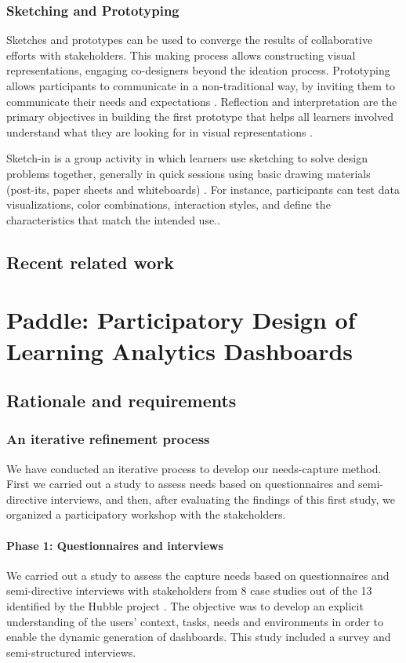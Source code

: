 \documentclass[manuscript,nonacm,12pt]{acmart}
\begin{document}
\subsubsection{Sketching and Prototyping}
Sketches and prototypes can be used to converge the results of collaborative efforts with stakeholders. This making process allows constructing visual representations, engaging co-designers beyond the ideation process. Prototyping allows participants to communicate in a non-traditional way, by inviting them to communicate their needs and expectations \cite{gaver1999design}.
Reflection and interpretation are the primary objectives in building the first prototype that helps all learners involved understand what they are looking for in visual representations \cite{luckin2013handbook}.

Sketch-in is a group activity in which learners use sketching to solve design problems together, generally in quick sessions using basic drawing materials (post-its, paper sheets and whiteboards) \cite{prieto2018co}. For instance, participants can test data visualizations, color combinations, interaction styles, and define the characteristics that match the intended use..



\subsection{Recent related work}


\section{Paddle: Participatory Design of Learning Analytics Dashboards}
\subsection{Rationale and requirements}
\subsubsection{An iterative refinement process}
\label{sec:dimensions}
We have conducted an iterative process to develop our needs-capture method. First we carried out a study to assess needs based on questionnaires and semi-directive interviews, and then, after evaluating  the findings of this first study, we organized a participatory workshop with the stakeholders.


\paragraph{Phase 1: Questionnaires and interviews}
We carried out a study to assess the capture needs based on questionnaires and semi-directive interviews with stakeholders from 8 case studies out of the 13 identified by the Hubble project \cite{dabbebi2017towards}. 
The objective was to develop an explicit understanding of the users' context, tasks, needs and environments in order to enable the dynamic generation of dashboards. This study included a survey and semi-structured interviews.
\end{document}
